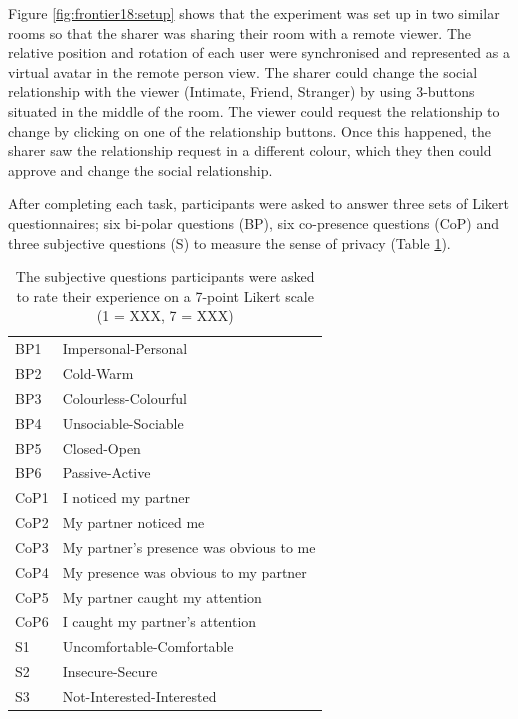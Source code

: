 Figure \ref{fig:frontier18:setup} shows that the experiment was set up in two similar rooms so that the sharer was sharing their room with a remote viewer. The relative position and rotation of each user were synchronised and represented as a virtual avatar in the remote person view. The sharer could change the social relationship with the viewer (Intimate, Friend, Stranger) by using 3-buttons situated in the middle of the room. The viewer could request the relationship to change by clicking on one of the relationship buttons. Once this happened, the sharer saw the relationship request in a different colour, which they then could approve and change the social relationship.

After completing each task, participants were asked to answer three sets of Likert questionnaires; six bi-polar questions (BP), six co-presence questions (CoP) and three subjective questions (S) to measure the sense of privacy (Table \ref{tab:frontier18:questions}).  

\begin{table}
    \centering
    \begin{tabular}{ll}
BP1 &    Impersonal-Personal\\
BP2 &    Cold-Warm\\
BP3 &    Colourless-Colourful\\
BP4 &    Unsociable-Sociable\\
BP5 &    Closed-Open\\
BP6 &    Passive-Active\\
CoP1    &   I noticed my partner\\
CoP2    &   My partner noticed me\\
CoP3    &   My partner's presence was obvious to me\\
CoP4    &   My presence was obvious to my partner\\
CoP5    &   My partner caught my attention \\
CoP6    &   I caught my partner's attention\\
S1  & Uncomfortable-Comfortable\\
S2  & Insecure-Secure\\
S3  & Not-Interested-Interested\\
    \end{tabular}
    \caption{The subjective questions participants were asked to rate their experience on a 7-point Likert scale (1 = XXX, 7 = XXX)}
    \label{tab:frontier18:questions}
\end{table}

